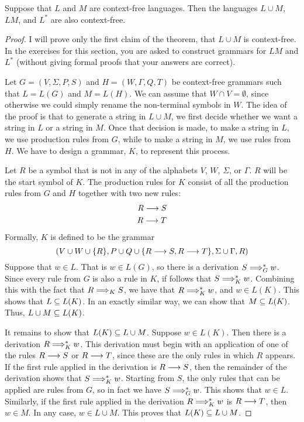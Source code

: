\begin{theorem}\label{T-CFG-closures}
Suppose that $L$ and $M$ are context-free languages.
Then the languages $L\cup M$, $LM$, and $L^*$ are also
context-free.
\end{theorem}
\begin{proof}
I will prove only the first claim of the theorem, that $L\cup M$ is
context-free.  In the exercises for this section, you are
asked to construct grammars for $LM$ and $L^*$ (without giving
formal proofs that your answers are correct).

Let $G=(V,\Sigma,P,S)$ and $H=(W,\Gamma,Q,T)$ be context-free grammars
such that $L=L(G)$ and $M=L(H)$.  We can assume that $W\cap V=\emptyset$,
since otherwise we could simply rename the non-terminal symbols in $W$.
The idea of the proof is that to generate a string in $L\cup M$,
we first decide whether we want a string in $L$ or a string in $M$.
Once that decision is made, to make a string in $L$, we use production
rules from $G$, while to make a string in $M$, we use rules from $H$.
We have to design a grammar, $K$, to represent this process.

Let $R$ be a symbol that is not in any of the alphabets $V$, $W$, $\Sigma$,
or $\Gamma$.  $R$ will be the start symbol of $K$.  The production rules
for $K$ consist of all the production rules from $G$ and $H$ together
with two new rules:
\begin{align*}
   R\longrightarrow S\\
   R\longrightarrow T
\end{align*}
Formally, $K$ is defined to be the grammar
\[ (V\cup W\cup\{R\},
       P\cup Q\cup \{R\longrightarrow S, R\longrightarrow T\},
       \Sigma\cup\Gamma, R) \]
Suppose that $w\in L$.  That is $w\in L(G)$, so there is
a derivation $S\Longrightarrow_G^*w$.
Since every rule from $G$ is also a rule in $K$, if follows that
$S\Longrightarrow_K^* w$.  Combining this with the fact that $R\Longrightarrow_K S$, we have
that $R\Longrightarrow_K^* w$, and $w\in L(K)$.  This shows that $L\subseteq L(K)$.
In an exactly similar way, we can show that $M\subseteq L(K)$.
Thus, $L\cup M\subseteq L(K)$.

It remains to show that $L(K)\subseteq L\cup M$.  Suppose $w\in L(K)$.
Then there is a derivation $R\Longrightarrow_K^*w$.  This derivation must
begin with an application of
one of the rules $R\longrightarrow S$ or $R\longrightarrow T$, since these are the
only rules in which $R$ appears.  If the first rule applied in the
derivation is $R\longrightarrow S$, then the remainder of the derivation
shows that $S\Longrightarrow_K^*w$.  Starting from $S$, the only rules
that can be applied are rules from $G$, so in fact we have
$S\Longrightarrow_G^*w$.  This shows that $w\in L$.  Similarly, if
the first rule applied in the derivation $R\Longrightarrow_K^*w$ is 
$R\longrightarrow T$, then $w\in M$.  In any case, $w\in L\cup M$.
This proves that $L(K)\subseteq L\cup M$.
\end{proof}

